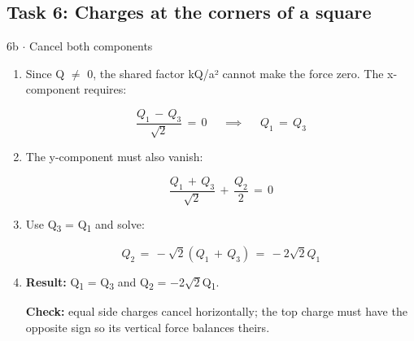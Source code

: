 \documentclass[11pt]{article}
\begin{document}
\begin{keepsection}\subsection{Task 6: Charges at the corners of a square}

\begin{workedbox}{6b \ensuremath{\cdot} Cancel both components}
\begin{enumerate}
\item {}
Since Q \ensuremath{\neq} 0, the shared factor kQ/a² cannot make the force zero. The x-component requires:

\begin{equation*}\dfrac{{Q}_{1}\, -\, {Q}_{3}}{\sqrt{2}}\, =\, 0\, \quad \, ⟹\, \quad \, {Q}_{1}\, =\, {Q}_{3}\end{equation*}
\item {}
The y-component must also vanish:

\begin{equation*}\dfrac{{Q}_{1}\, +\, {Q}_{3}}{\sqrt{2}}\, +\, \dfrac{{Q}_{2}}{2}\, =\, 0\end{equation*}
\item {}
Use Q\textsubscript{3} = Q\textsubscript{1} and solve:

\begin{equation*}{Q}_{2}\, =\, -\sqrt{2}({Q}_{1}\, +\, {Q}_{3})\, =\, -2\sqrt{2}{Q}_{1}\end{equation*}
\item {}
\textbf{Result:} Q\textsubscript{1} = Q\textsubscript{3} and Q\textsubscript{2} = \ensuremath{-}2\ensuremath{\sqrt{2}}Q\textsubscript{1}.

\textbf{Check:} equal side charges cancel horizontally; the top charge must have the opposite sign so its vertical force balances theirs.
\end{enumerate}
\end{workedbox}

\end{keepsection}
\end{document}
